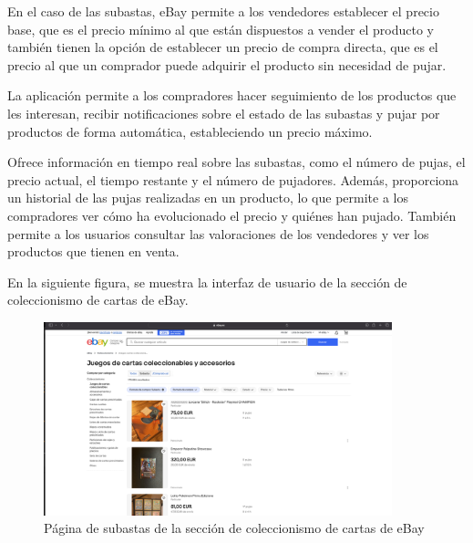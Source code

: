 En el caso de las subastas, eBay permite a los vendedores establecer el precio base, que es el precio mínimo al que están dispuestos a vender el producto y también tienen la opción de establecer un precio de compra directa, que es el precio al que un comprador puede adquirir el producto sin necesidad de pujar.

La aplicación permite a los compradores hacer seguimiento de los productos que les interesan, recibir notificaciones sobre el estado de las subastas y pujar por productos de forma automática, estableciendo un precio máximo.

Ofrece información en tiempo real sobre las subastas, como el número de pujas, el precio actual, el tiempo restante y el número de pujadores. Además, proporciona un historial de las pujas realizadas en un producto, lo que permite a los compradores ver cómo ha evolucionado el precio y quiénes han pujado.
También permite a los usuarios consultar las valoraciones de los vendedores y ver los productos que tienen en venta.

En la siguiente figura, se muestra la interfaz de usuario de la sección de coleccionismo de cartas de eBay.
\begin{figure}[H]
    \centering
    \includegraphics[width=0.9\textwidth]{figures/4-Estudio-viabilidad/4_Ebay.png}
    \caption{Página de subastas de la sección de coleccionismo de cartas de eBay}
    \label{fig:ebay}
    \hypertarget{fig:ebay}{}
\end{figure} 

